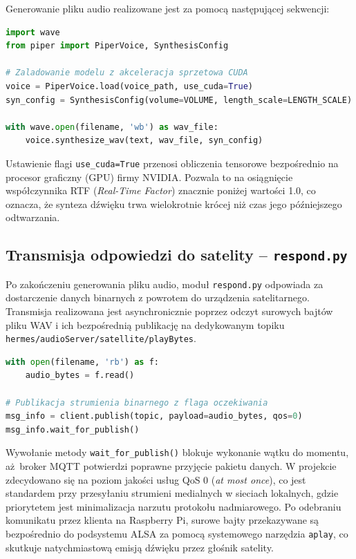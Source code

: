 \documentclass[12pt,a4paper]{article}
\begin{document}
Generowanie pliku audio realizowane jest za pomocą następującej sekwencji:

\begin{center}
\begin{minipage}{0.85\textwidth}
\begin{lstlisting}[language=Python]
import wave
from piper import PiperVoice, SynthesisConfig

# Zaladowanie modelu z akceleracja sprzetowa CUDA
voice = PiperVoice.load(voice_path, use_cuda=True)
syn_config = SynthesisConfig(volume=VOLUME, length_scale=LENGTH_SCALE)

with wave.open(filename, 'wb') as wav_file:
    voice.synthesize_wav(text, wav_file, syn_config)
\end{lstlisting}
\end{minipage}
\end{center}

Ustawienie flagi \texttt{use\_cuda=True} przenosi obliczenia tensorowe bezpośrednio na procesor graficzny (GPU) firmy NVIDIA. Pozwala to na osiągnięcie współczynnika RTF (\textit{Real-Time Factor}) znacznie poniżej wartości 1.0, co oznacza, że synteza dźwięku trwa wielokrotnie krócej niż czas jego późniejszego odtwarzania.

\subsection{Transmisja odpowiedzi do satelity – \texttt{respond.py}}
Po zakończeniu generowania pliku audio, moduł \texttt{respond.py} odpowiada za dostarczenie danych binarnych z powrotem do urządzenia satelitarnego. Transmisja realizowana jest asynchronicznie poprzez odczyt surowych bajtów pliku WAV i ich bezpośrednią publikację na dedykowanym topiku \texttt{hermes/audioServer/satellite/playBytes}.

\begin{center}
\begin{minipage}{0.85\textwidth}
\begin{lstlisting}[language=Python]
with open(filename, 'rb') as f:
    audio_bytes = f.read()

# Publikacja strumienia binarnego z flaga oczekiwania
msg_info = client.publish(topic, payload=audio_bytes, qos=0)
msg_info.wait_for_publish()
\end{lstlisting}
\end{minipage}
\end{center}

Wywołanie metody \texttt{wait\_for\_publish()} blokuje wykonanie wątku do momentu, aż~broker MQTT potwierdzi poprawne przyjęcie pakietu danych. W projekcie zdecydowano się na poziom jakości usług QoS 0 (\textit{at most once}), co jest standardem przy przesyłaniu strumieni medialnych w sieciach lokalnych, gdzie priorytetem jest minimalizacja narzutu protokołu nadmiarowego. Po odebraniu komunikatu przez klienta na Raspberry Pi, surowe bajty przekazywane są bezpośrednio do podsystemu ALSA za pomocą systemowego narzędzia \texttt{aplay}, co skutkuje natychmiastową emisją dźwięku przez głośnik satelity.
\end{document}

